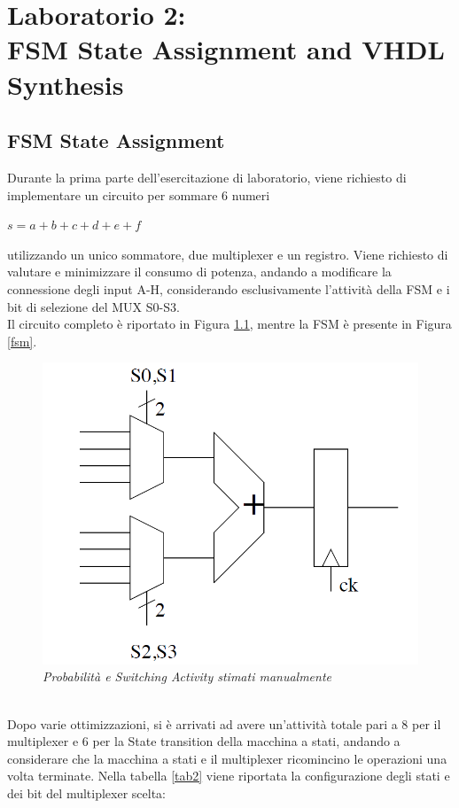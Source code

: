 
\chapter{Laboratorio 2: \\FSM State Assignment and VHDL Synthesis}
\section{FSM State Assignment}
Durante la prima parte dell'esercitazione di laboratorio, viene richiesto di implementare un circuito per sommare 6 numeri
\begin{center}
	$s=a+b+c+d+e+f $
\end{center}
utilizzando un unico sommatore, due multiplexer e un registro. Viene richiesto di valutare e minimizzare il consumo di potenza, andando a modificare la connessione degli input A-H, considerando esclusivamente l'attività della FSM e i bit di selezione del MUX S0-S3.\\
Il circuito completo è riportato in Figura \ref{datapath}, mentre la FSM è presente in Figura \ref{fsm}.\\
\begin{figure}[!htb]
	\centering
	\includegraphics[scale=0.6]{immagini/circuito}
	\caption{\textit{Probabilità e Switching Activity stimati manualmente}}
	\label{datapath}
\end{figure} \\
Dopo varie ottimizzazioni, si è arrivati ad avere un'attività totale pari a 8 per il multiplexer e 6 per la State transition della macchina a stati, andando a considerare che la macchina a stati e il multiplexer ricomincino le operazioni una volta terminate. Nella tabella \ref{tab2} viene riportata la configurazione degli stati e dei bit del multiplexer scelta:
